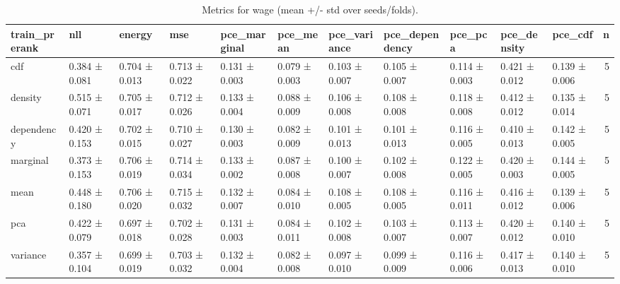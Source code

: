 \begin{table}
\caption{Metrics for wage (mean +/- std over seeds/folds).}
\label{tab:metrics_summary_wage}
\begin{tabular}{lllllllllllr}
\toprule
train_prerank & nll & energy & mse & pce_marginal & pce_mean & pce_variance & pce_dependency & pce_pca & pce_density & pce_cdf & n \\
\midrule
cdf & 0.384 ± 0.081 & 0.704 ± 0.013 & 0.713 ± 0.022 & 0.131 ± 0.003 & 0.079 ± 0.003 & 0.103 ± 0.007 & 0.105 ± 0.007 & 0.114 ± 0.003 & 0.421 ± 0.012 & 0.139 ± 0.006 & 5 \\
density & 0.515 ± 0.071 & 0.705 ± 0.017 & 0.712 ± 0.026 & 0.133 ± 0.004 & 0.088 ± 0.009 & 0.106 ± 0.008 & 0.108 ± 0.008 & 0.118 ± 0.008 & 0.412 ± 0.012 & 0.135 ± 0.014 & 5 \\
dependency & 0.420 ± 0.153 & 0.702 ± 0.015 & 0.710 ± 0.027 & 0.130 ± 0.003 & 0.082 ± 0.009 & 0.101 ± 0.013 & 0.101 ± 0.013 & 0.116 ± 0.005 & 0.410 ± 0.013 & 0.142 ± 0.005 & 5 \\
marginal & 0.373 ± 0.153 & 0.706 ± 0.019 & 0.714 ± 0.034 & 0.133 ± 0.002 & 0.087 ± 0.008 & 0.100 ± 0.007 & 0.102 ± 0.008 & 0.122 ± 0.005 & 0.420 ± 0.003 & 0.144 ± 0.005 & 5 \\
mean & 0.448 ± 0.180 & 0.706 ± 0.020 & 0.715 ± 0.032 & 0.132 ± 0.007 & 0.084 ± 0.010 & 0.108 ± 0.005 & 0.108 ± 0.005 & 0.116 ± 0.011 & 0.416 ± 0.012 & 0.139 ± 0.006 & 5 \\
pca & 0.422 ± 0.079 & 0.697 ± 0.018 & 0.702 ± 0.028 & 0.131 ± 0.003 & 0.084 ± 0.011 & 0.102 ± 0.008 & 0.103 ± 0.007 & 0.113 ± 0.007 & 0.420 ± 0.012 & 0.140 ± 0.010 & 5 \\
variance & 0.357 ± 0.104 & 0.699 ± 0.019 & 0.703 ± 0.032 & 0.132 ± 0.004 & 0.082 ± 0.008 & 0.097 ± 0.010 & 0.099 ± 0.009 & 0.116 ± 0.006 & 0.417 ± 0.013 & 0.140 ± 0.010 & 5 \\
\bottomrule
\end{tabular}
\end{table}
